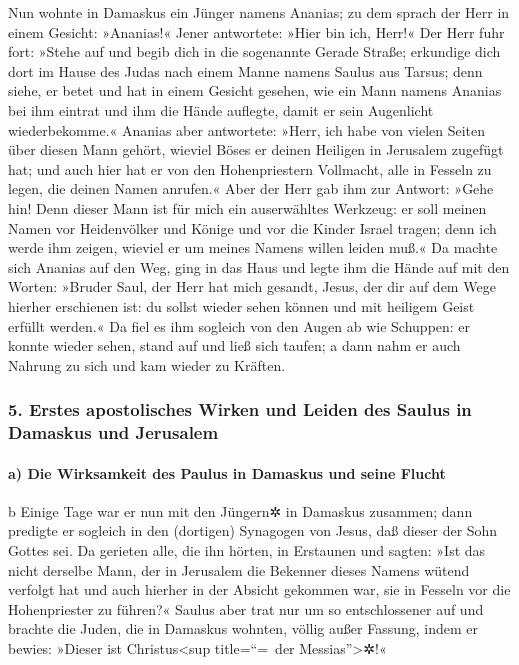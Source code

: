  Nun wohnte in Damaskus ein Jünger namens Ananias; zu dem
sprach der Herr in einem Gesicht: »Ananias!« Jener antwortete: »Hier bin
ich, Herr!«  Der Herr fuhr fort: »Stehe auf und begib
dich in die sogenannte Gerade Straße; erkundige dich dort im Hause des
Judas nach einem Manne namens Saulus aus Tarsus; denn siehe, er betet
 und hat in einem Gesicht gesehen, wie ein Mann namens
Ananias bei ihm eintrat und ihm die Hände auflegte, damit er sein
Augenlicht wiederbekomme.«  Ananias aber antwortete:
»Herr, ich habe von vielen Seiten über diesen Mann gehört, wieviel Böses
er deinen Heiligen in Jerusalem zugefügt hat;  und auch
hier hat er von den Hohenpriestern Vollmacht, alle in Fesseln zu legen,
die deinen Namen anrufen.«  Aber der Herr gab ihm zur
Antwort: »Gehe hin! Denn dieser Mann ist für mich ein auserwähltes
Werkzeug: er soll meinen Namen vor Heidenvölker und Könige und vor die
Kinder Israel tragen;  denn ich werde ihm zeigen, wieviel
er um meines Namens willen leiden muß.«  Da machte sich
Ananias auf den Weg, ging in das Haus und legte ihm die Hände auf mit
den Worten: »Bruder Saul, der Herr hat mich gesandt, Jesus, der dir auf
dem Wege hierher erschienen ist: du sollst wieder sehen können und mit
heiligem Geist erfüllt werden.«  Da fiel es ihm sogleich
von den Augen ab wie Schuppen: er konnte wieder sehen, stand auf und
ließ sich taufen;  a dann nahm er auch Nahrung zu sich
und kam wieder zu Kräften.

\hypertarget{erstes-apostolisches-wirken-und-leiden-des-saulus-in-damaskus-und-jerusalem}{%
\subsubsection{5. Erstes apostolisches Wirken und Leiden des Saulus in
Damaskus und
Jerusalem}\label{erstes-apostolisches-wirken-und-leiden-des-saulus-in-damaskus-und-jerusalem}}

\hypertarget{a-die-wirksamkeit-des-paulus-in-damaskus-und-seine-flucht}{%
\paragraph{a) Die Wirksamkeit des Paulus in Damaskus und seine
Flucht}\label{a-die-wirksamkeit-des-paulus-in-damaskus-und-seine-flucht}}

b Einige Tage war er nun mit den Jüngern✲ in Damaskus zusammen;
 dann predigte er sogleich in den (dortigen) Synagogen
von Jesus, daß dieser der Sohn Gottes sei.  Da gerieten
alle, die ihn hörten, in Erstaunen und sagten: »Ist das nicht derselbe
Mann, der in Jerusalem die Bekenner dieses Namens wütend verfolgt hat
und auch hierher in der Absicht gekommen war, sie in Fesseln vor die
Hohenpriester zu führen?«  Saulus aber trat nur um so
entschlossener auf und brachte die Juden, die in Damaskus wohnten,
völlig außer Fassung, indem er bewies: »Dieser ist Christus\textless sup
title=``=~der Messias''\textgreater✲!«

